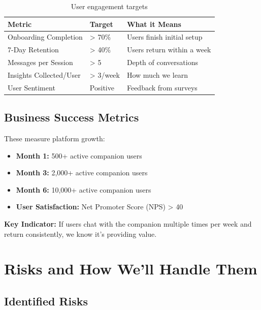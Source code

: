 \documentclass[12pt,a4paper]{article}
\begin{document}
\begin{table}[h]
\centering
\begin{tabular}{|l|l|l|}
\hline
\textbf{Metric} & \textbf{Target} & \textbf{What it Means} \\
\hline
Onboarding Completion & > 70\% & Users finish initial setup \\
7-Day Retention & > 40\% & Users return within a week \\
Messages per Session & > 5 & Depth of conversations \\
Insights Collected/User & > 3/week & How much we learn \\
User Sentiment & Positive & Feedback from surveys \\
\hline
\end{tabular}
\caption{User engagement targets}
\end{table}

\subsection{Business Success Metrics}

These measure platform growth:

\begin{itemize}
  \item \textbf{Month 1:} 500+ active companion users
  \item \textbf{Month 3:} 2,000+ active companion users
  \item \textbf{Month 6:} 10,000+ active companion users
  \item \textbf{User Satisfaction:} Net Promoter Score (NPS) > 40
\end{itemize}

\begin{keypoint}
\textbf{Key Indicator:} If users chat with the companion multiple times per week and return consistently, we know it's providing value.
\end{keypoint}

\section{Risks and How We'll Handle Them}

\subsection{Identified Risks}
\end{document}

